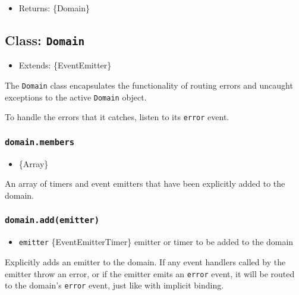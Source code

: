\begin{itemize}
\tightlist
\item
  Returns: \{Domain\}
\end{itemize}

\subsection{\texorpdfstring{Class:
\texttt{Domain}}{Class: Domain}}\label{class-domain}

\begin{itemize}
\tightlist
\item
  Extends: \{EventEmitter\}
\end{itemize}

The \texttt{Domain} class encapsulates the functionality of routing
errors and uncaught exceptions to the active \texttt{Domain} object.

To handle the errors that it catches, listen to its
\texttt{\textquotesingle{}error\textquotesingle{}} event.

\subsubsection{\texorpdfstring{\texttt{domain.members}}{domain.members}}\label{domain.members}

\begin{itemize}
\tightlist
\item
  \{Array\}
\end{itemize}

An array of timers and event emitters that have been explicitly added to
the domain.

\subsubsection{\texorpdfstring{\texttt{domain.add(emitter)}}{domain.add(emitter)}}\label{domain.addemitter}

\begin{itemize}
\tightlist
\item
  \texttt{emitter} \{EventEmitter\textbar Timer\} emitter or timer to be
  added to the domain
\end{itemize}

Explicitly adds an emitter to the domain. If any event handlers called
by the emitter throw an error, or if the emitter emits an
\texttt{\textquotesingle{}error\textquotesingle{}} event, it will be
routed to the domain's
\texttt{\textquotesingle{}error\textquotesingle{}} event, just like with
implicit binding.

